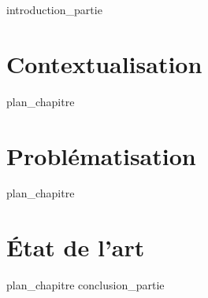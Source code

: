 \label{part:01_int}
{introduction_partie}
%
\chapter{Contextualisation}
\label{chap:1}
{plan_chapitre}
%
\chapter{Problématisation}
\label{chap:2}
{plan_chapitre}
%
\chapter{État de l'art}
\label{chap:3}
{plan_chapitre}
%
\label{part:01_cnc}
{conclusion_partie}
